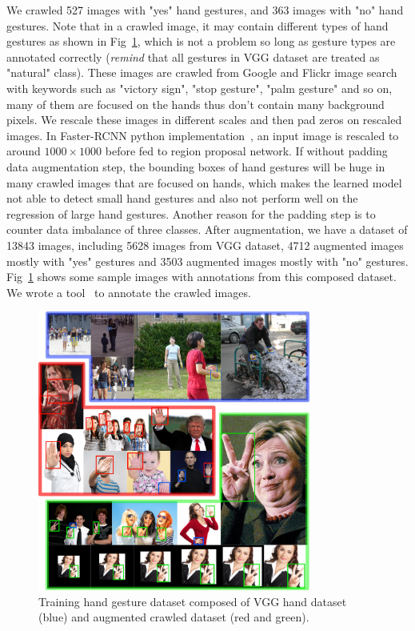 We crawled 527 images with "yes" hand gestures, and 363 images with "no" hand gestures. Note that in a crawled image, it may contain different types of hand gestures as shown in Fig~\ref{fig:ch4-gesturedataset}, which is not a problem so long as gesture types are annotated correctly (\emph{remind} that all gestures in VGG dataset are treated as "natural" class). These images are crawled from Google and Flickr image search with keywords such as "victory sign", "stop gesture", "palm gesture" and so on, many of them are focused on the hands thus don't contain many background pixels. We rescale these images in different scales and then pad zeros on rescaled images. In Faster-RCNN python implementation~\cite{links:pyfasterrcnn}, an input image is rescaled to around $1000\times 1000$ before fed to region proposal network. If without padding data augmentation step, the bounding boxes of hand gestures will be huge in many crawled images that are focused on hands, which makes the learned model not able to detect small hand gestures and also not perform well on the regression of large hand gestures. Another reason for the padding step is to counter data imbalance of three classes. After augmentation, we have a dataset of 13843 images, including 5628 images from VGG dataset, 4712 augmented images mostly with "yes" gestures and 3503 augmented images mostly with "no" gestures. Fig~\ref{fig:ch4-gesturedataset} shows some sample images with annotations from this composed dataset. We wrote a tool~\cite{links:imgannota} to annotate the crawled images.

\begin{figure}[!htbp]
    \centering
    \includegraphics[width=0.8\textwidth]{figure/ch4-gesturedataset.png}
    \caption{Training hand gesture dataset composed of VGG hand dataset (blue) and augmented crawled dataset (red and green).}
    \label{fig:ch4-gesturedataset}
\end{figure}

